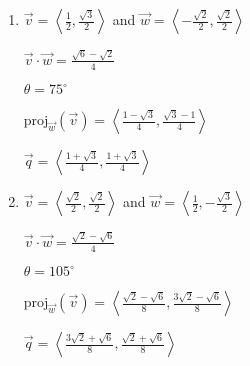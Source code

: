 \begin{multicols}{2} \raggedcolumns 
\begin{enumerate}
\setcounter{enumi}{\value{HW}}

\item $\vec{v} = \left\langle \frac{1}{2}, \frac{\sqrt{3}}{2} \right\rangle$ and $\vec{w} = \left\langle -\frac{\sqrt{2}}{2}, \frac{\sqrt{2}}{2} \right\rangle$

 $\vec{v} \cdot \vec{w} = \frac{\sqrt{6} - \sqrt{2}}{4}$

 $\theta = 75^{\circ}$ 

 $\text{proj}_{\vec{w}}(\vec{v}) = \left\langle \frac{1-\sqrt{3}}{4}, \frac{\sqrt{3} - 1}{4} \right\rangle$

 $\vec{q} = \left\langle \frac{1+\sqrt{3}}{4}, \frac{1 +\sqrt{3}}{4} \right\rangle$
 \vfill
 
\item $\vec{v} = \left\langle \frac{\sqrt{2}}{2}, \frac{\sqrt{2}}{2} \right\rangle$ and $\vec{w} = \left\langle \frac{1}{2}, -\frac{\sqrt{3}}{2} \right\rangle$

 $\vec{v} \cdot \vec{w} = \frac{\sqrt{2} - \sqrt{6}}{4}$

 $\theta  = 105^{\circ}$ 

 $\text{proj}_{\vec{w}}(\vec{v}) = \left\langle \frac{\sqrt{2}-\sqrt{6}}{8}, \frac{3\sqrt{2} - \sqrt{6}}{8} \right\rangle$

 $\vec{q} =  \left\langle \frac{3\sqrt{2}+\sqrt{6}}{8}, \frac{\sqrt{2} + \sqrt{6}}{8} \right\rangle$

\setcounter{HW}{\value{enumi}}
\end{enumerate}
\end{multicols}


